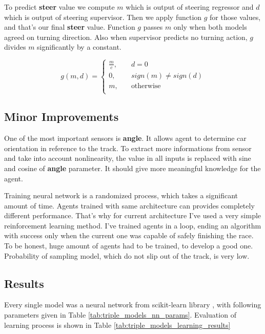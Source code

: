 \documentclass[declaration,shortabstract,english,inz]{iithesis}
\begin{document}
To predict \textbf{steer} value we compute $m$ which is output of steering regressor and $d$ which is output of steering supervisor.
Then we apply function $g$ for those values, and that's our final \textbf{steer} value.
Function $g$ passes $m$ only when both models agreed on turning direction.
Also when supervisor predicts no turning action, $g$ divides $m$ significantly by a constant.

 $$ g(m, d) =  \begin{cases}
    \frac{m}{c},  &\quad d = 0 \\
    0, &\quad sign(m) \neq sign(d) \\
    m, &\quad \text{otherwise} \\
  \end{cases}
 $$

\subsection{Minor Improvements}
One of the most important sensors is \textbf{angle}.
It allows agent to determine car orientation in reference to the track.
To extract more informations from sensor and take into account nonlinearity, the value in all inputs is replaced with sine and cosine of \textbf{angle} parameter.
It should give more meaningful knowledge for the agent.



Training neural network is a randomized process, which takes a significant amount of time.
Agents trained with same architecture can provides completely different performance.
That's why for current architecture I've used a very simple reinforcement learning method.
I've trained agents in a loop, ending an algorithm with success only when the current one was capable of safely finishing the race.
To be honest, huge amount of agents had to be trained, to develop a good one.
Probability of sampling model, which do not slip out of the track, is very low.



\subsection{Results}



Every single model was a neural network from scikit-learn library \cite{scikit_learn}, with following parameters given in Table \ref{tab:triple_models_nn_params}. Evaluation of learning process is shown in Table \ref{tab:triple_models_learning_results}
\end{document}
